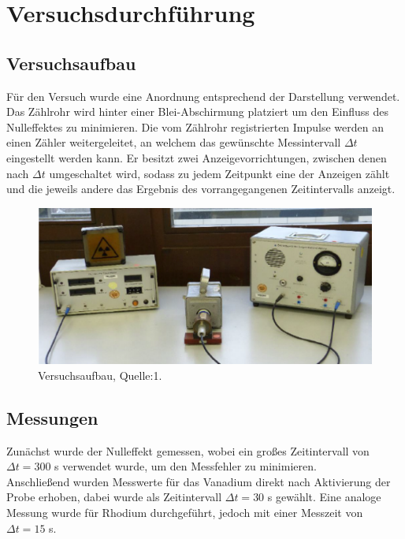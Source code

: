 \section{Versuchsdurchführung}
\label{sec:durchfuehrung}
\subsection{Versuchsaufbau}
\label{sec:aufbau}

Für den Versuch wurde eine Anordnung entsprechend der Darstellung verwendet. Das Zählrohr wird hinter einer 
Blei-Abschirmung platziert um den Einfluss des Nulleffektes zu minimieren. Die vom Zählrohr registrierten 
Impulse werden an einen Zähler weitergeleitet, an welchem das gewünschte Messintervall $\Delta t$ eingestellt 
werden kann. Er besitzt zwei Anzeigevorrichtungen, zwischen denen nach $\Delta t$ umgeschaltet wird, sodass 
zu jedem Zeitpunkt eine der Anzeigen zählt und die jeweils andere das Ergebnis des vorrangegangenen 
Zeitintervalls anzeigt.
\begin{figure}
    \centering
    \includegraphics{aufbau.pdf}
    \caption{Versuchsaufbau, Quelle:1.}
    \label{fig:rhodium}
  \end{figure}

\subsection{Messungen}
\label{sec:messungen}
Zunächst wurde der Nulleffekt gemessen, wobei ein großes Zeitintervall von $\Delta t=300$ s verwendet 
wurde, um den Messfehler zu minimieren. \\
Anschließend wurden Messwerte für das Vanadium direkt nach Aktivierung der Probe erhoben, dabei wurde 
als Zeitintervall $\Delta t=30$ s gewählt. Eine analoge Messung wurde für Rhodium durchgeführt, jedoch 
mit einer Messzeit von $\Delta t=15$ s.  